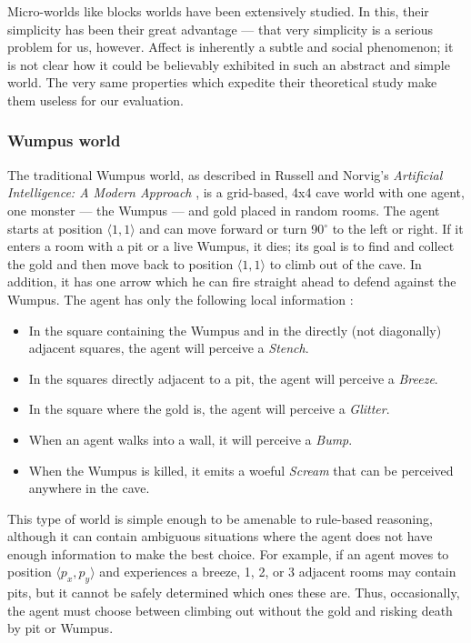 Micro-worlds like blocks worlds have been extensively studied. In this, their simplicity has been their great advantage --- that very simplicity is a serious problem for us, however. Affect is inherently a subtle and social phenomenon; it is not clear how it could be believably exhibited in such an abstract and simple world. The very same properties which expedite their theoretical study make them useless for our evaluation.


\subsubsection{Wumpus world}

The traditional Wumpus world, as described in Russell and Norvig's {\em Artificial Intelligence: A Modern Approach} \cite[p. 236]{norvig}, is a grid-based, 4x4 cave world with one agent, one monster --- the Wumpus --- and gold placed in random rooms. The agent starts at position $\langle 1,1\rangle$ and can move forward or turn 90$^\circ$ to the left or right. If it enters a room with a pit or a live Wumpus, it dies; its goal is to find and collect the gold and then move back to position $\langle 1,1\rangle$ to climb out of the cave. In addition, it has one arrow which he can fire straight ahead to defend against the Wumpus. The agent has only the following local information \cite[p. 237]{norvig}:
\begin{itemize}
	\item In the square containing the Wumpus and in the directly (not diagonally) adjacent squares, the agent will perceive a {\em Stench}.
	\item In the squares directly adjacent to a pit, the agent will perceive a {\em Breeze}.
	\item In the square where the gold is, the agent will perceive a {\em Glitter}.
	\item When an agent walks into a wall, it will perceive a {\em Bump}.
	\item When the Wumpus is killed, it emits a woeful {\em Scream} that can be perceived anywhere in the cave.
\end{itemize}

This type of world is simple enough to be amenable to rule-based reasoning, although it can contain ambiguous situations where the agent does not have enough information to make the best choice. For example, if an agent moves to position $\langle p_x,p_y \rangle$ and experiences a breeze, 1, 2, or 3 adjacent rooms may contain pits, but it cannot be safely determined which ones these are. Thus,  occasionally, the agent must choose between climbing out without the gold and risking death by pit or Wumpus.

